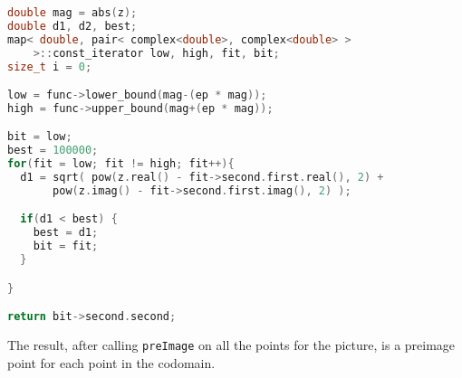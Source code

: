 \documentclass[letterpaper,12pt]{article}
\begin{document}
\begin{lstlisting}[language=c++]
double mag = abs(z);
double d1, d2, best;
map< double, pair< complex<double>, complex<double> >
    >::const_iterator low, high, fit, bit;
size_t i = 0;

low = func->lower_bound(mag-(ep * mag));
high = func->upper_bound(mag+(ep * mag));

bit = low;
best = 100000;
for(fit = low; fit != high; fit++){
  d1 = sqrt( pow(z.real() - fit->second.first.real(), 2) +
       pow(z.imag() - fit->second.first.imag(), 2) );

  if(d1 < best) {
    best = d1;
    bit = fit;
  }

}

return bit->second.second;

\end{lstlisting}

The result, after calling \verb|preImage| on all the points for the picture, is a preimage point for each point in the codomain. \\ \\
\end{document}
